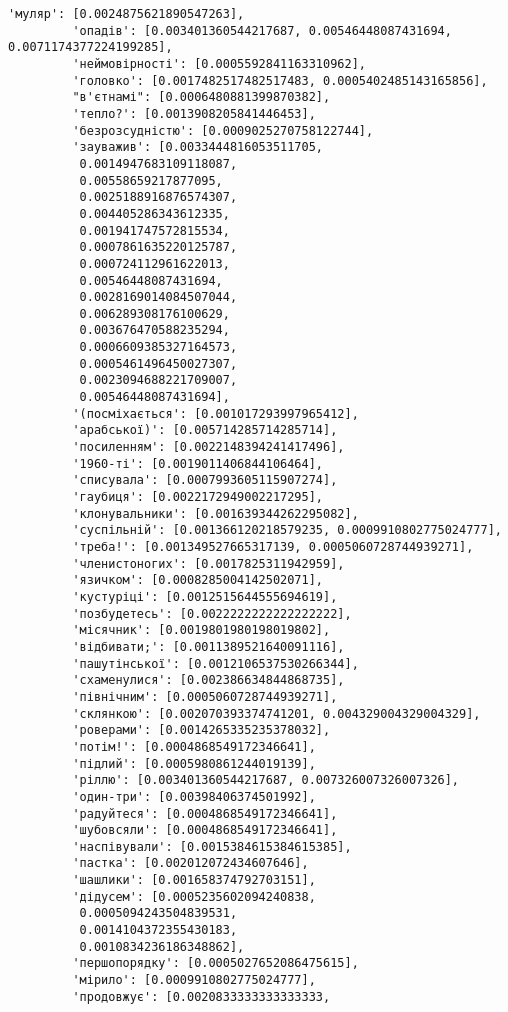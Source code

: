 \documentclass[11pt]{article}
\begin{document}
\begin{Verbatim}[commandchars=\\\{\}]
         'муляр': [0.0024875621890547263],
         'опадів': [0.003401360544217687, 0.00546448087431694, 0.0071174377224199285],
         'неймовірності': [0.0005592841163310962],
         'головко': [0.0017482517482517483, 0.0005402485143165856],
         "в'єтнамі": [0.0006480881399870382],
         'тепло?': [0.0013908205841446453],
         'безрозсудністю': [0.0009025270758122744],
         'зауважив': [0.0033444816053511705,
          0.0014947683109118087,
          0.00558659217877095,
          0.0025188916876574307,
          0.004405286343612335,
          0.001941747572815534,
          0.0007861635220125787,
          0.000724112961622013,
          0.00546448087431694,
          0.0028169014084507044,
          0.006289308176100629,
          0.003676470588235294,
          0.0006609385327164573,
          0.0005461496450027307,
          0.0023094688221709007,
          0.00546448087431694],
         '(посміхається': [0.001017293997965412],
         'арабської)': [0.005714285714285714],
         'посиленням': [0.0022148394241417496],
         '1960-ті': [0.0019011406844106464],
         'списувала': [0.0007993605115907274],
         'гаубиця': [0.0022172949002217295],
         'клонувальники': [0.001639344262295082],
         'суспільній': [0.001366120218579235, 0.0009910802775024777],
         'треба!': [0.001349527665317139, 0.0005060728744939271],
         'членистоногих': [0.0017825311942959],
         'язичком': [0.0008285004142502071],
         'кустуріці': [0.0012515644555694619],
         'позбудетесь': [0.0022222222222222222],
         'місячник': [0.0019801980198019802],
         'відбивати;': [0.0011389521640091116],
         'пашутінської': [0.0012106537530266344],
         'схаменулися': [0.002386634844868735],
         'північним': [0.0005060728744939271],
         'склянкою': [0.002070393374741201, 0.004329004329004329],
         'роверами': [0.0014265335235378032],
         'потім!': [0.0004868549172346641],
         'підлий': [0.0005980861244019139],
         'ріллю': [0.003401360544217687, 0.007326007326007326],
         'один-три': [0.00398406374501992],
         'радуйтеся': [0.0004868549172346641],
         'шубовсяли': [0.0004868549172346641],
         'наспівували': [0.0015384615384615385],
         'пастка': [0.002012072434607646],
         'шашлики': [0.001658374792703151],
         'дідусем': [0.0005235602094240838,
          0.0005094243504839531,
          0.0014104372355430183,
          0.0010834236186348862],
         'першопорядку': [0.0005027652086475615],
         'мірило': [0.0009910802775024777],
         'продовжує': [0.0020833333333333333,

\end{Verbatim}
\end{document}

